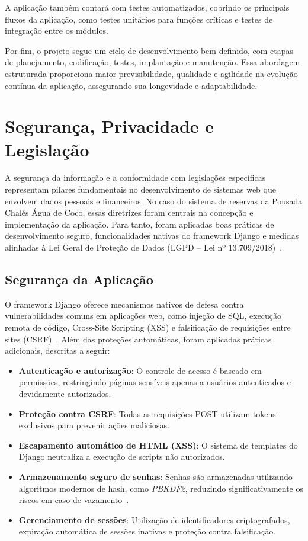 \documentclass[
	12pt,				%
	openany,			%
	oneside,			%
	a4paper,			%
	english,			%
	french,				%
	spanish,			%
	brazil				%
	]{abntex2}
\begin{document}
A aplicação também contará com testes automatizados, cobrindo os principais fluxos da aplicação, como testes unitários para funções críticas e testes de integração entre os módulos.

Por fim, o projeto segue um ciclo de desenvolvimento bem definido, com etapas de planejamento, codificação, testes, implantação e manutenção. Essa abordagem estruturada proporciona maior previsibilidade, qualidade e agilidade na evolução contínua da aplicação, assegurando sua longevidade e adaptabilidade.

\section{Segurança, Privacidade e Legislação}

A segurança da informação e a conformidade com legislações específicas representam pilares fundamentais no desenvolvimento de sistemas web que envolvem dados pessoais e financeiros. No caso do sistema de reservas da Pousada Chalés Água de Coco, essas diretrizes foram centrais na concepção e implementação da aplicação. Para tanto, foram aplicadas boas práticas de desenvolvimento seguro, funcionalidades nativas do framework Django e medidas alinhadas à Lei Geral de Proteção de Dados (LGPD – Lei nº 13.709/2018)~\cite{lgpd}.

\subsection{Segurança da Aplicação}

O framework Django oferece mecanismos nativos de defesa contra vulnerabilidades comuns em aplicações web, como injeção de SQL, execução remota de código, Cross-Site Scripting (XSS) e falsificação de requisições entre sites (CSRF)~\cite{django}. Além das proteções automáticas, foram aplicadas práticas adicionais, descritas a seguir:

\begin{itemize}
	\item \textbf{Autenticação e autorização}: O controle de acesso é baseado em permissões, restringindo páginas sensíveis apenas a usuários autenticados e devidamente autorizados.
	\item \textbf{Proteção contra CSRF}: Todas as requisições POST utilizam tokens exclusivos para prevenir ações maliciosas.
	\item \textbf{Escapamento automático de HTML (XSS)}: O sistema de templates do Django neutraliza a execução de scripts não autorizados.
	\item \textbf{Armazenamento seguro de senhas}: Senhas são armazenadas utilizando algoritmos modernos de hash, como \textit{PBKDF2}, reduzindo significativamente os riscos em caso de vazamento~\cite{owasp}.
	\item \textbf{Gerenciamento de sessões}: Utilização de identificadores criptografados, expiração automática de sessões inativas e proteção contra falsificação.
\end{itemize}
\end{document}
